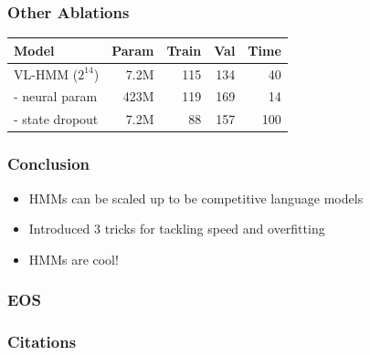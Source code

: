 \documentclass{beamer}
\begin{document}
\begin{frame}
\frametitle{Other Ablations}

\begin{center}
\begin{tabular}{lrrrr}
\toprule
Model                & Param & Train  & Val  &  Time \\
\midrule
VL-HMM ($2^{14}$)    & 7.2M & 115    & 134  & 40\\
\quad - neural param & 423M & 119    & 169  & 14\\
\quad - state dropout      & 7.2M & 88     & 157  & 100\\
\bottomrule
\end{tabular}
\end{center}
\end{frame}


\begin{frame}
\frametitle{Conclusion}
\begin{itemize}
\item HMMs can be scaled up to be competitive language models
\item Introduced 3 tricks for tackling speed and overfitting
\item HMMs are cool!
\end{itemize}
\end{frame}

\begin{frame}
\frametitle{EOS}
\end{frame}


\begin{frame}
\frametitle{Citations}


\end{frame}
\end{document}
